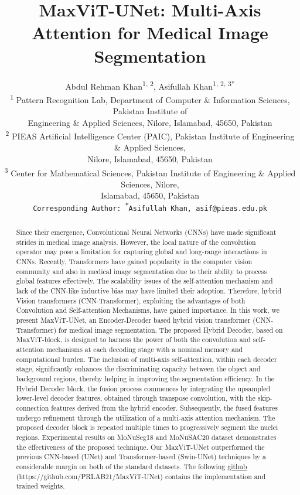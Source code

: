 \documentclass{article}
\title{MaxViT-UNet: Multi-Axis Attention for Medical Image Segmentation
}
\author{
  Abdul Rehman Khan\textsuperscript{1, 2}, Asifullah Khan\textsuperscript{1, 2, 3*} \\
  \textsuperscript{1} Pattern Recognition Lab, Department of Computer \& Information Sciences, Pakistan Institute of \\Engineering \& Applied Sciences, Nilore, Islamabad, 45650, Pakistan \\
  \textsuperscript{2} PIEAS Artificial Intelligence Center (PAIC), Pakistan Institute of Engineering \& Applied Sciences, \\Nilore, Islamabad, 45650, Pakistan \\
  \textsuperscript{3} Center for Mathematical Sciences, Pakistan Institute of Engineering \& Applied Sciences, Nilore, \\Islamabad, 45650, Pakistan \\
  \texttt{Corresponding Author: \textsuperscript{*}Asifullah Khan, asif@pieas.edu.pk} \\
}
\begin{document}
\maketitle


\begin{abstract}
Since their emergence, Convolutional Neural Networks (CNNs) have made significant strides in medical image analysis. However, the local nature of the convolution operator may pose a limitation for capturing global and long-range interactions in CNNs. Recently, Transformers have gained popularity in the computer vision community and also in medical image segmentation due to their ability to process global features effectively. The scalability issues of the self-attention mechanism and lack of the CNN-like inductive bias may have limited their adoption. Therefore, hybrid Vision transformers (CNN-Transformer), exploiting the advantages of both Convolution and Self-attention Mechanisms, have gained importance. In this work, we present MaxViT-UNet, an Encoder-Decoder based hybrid vision transformer (CNN-Transformer) for medical image segmentation. The proposed Hybrid Decoder, based on MaxViT-block, is designed to harness the power of both the convolution and self-attention mechanisms at each decoding stage with a nominal memory and computational burden. The inclusion of multi-axis self-attention, within each decoder stage, significantly enhances the discriminating capacity between the object and background regions, thereby helping in improving the segmentation efficiency. In the Hybrid Decoder block, the fusion process commences by integrating the upsampled lower-level decoder features, obtained through transpose convolution, with the skip-connection features derived from the hybrid encoder. Subsequently, the fused features undergo refinement through the utilization of a multi-axis attention mechanism. The proposed decoder block is repeated multiple times to progressively segment the nuclei regions. Experimental results on MoNuSeg18 and MoNuSAC20 dataset demonstrates the effectiveness of the proposed technique. Our MaxViT-UNet outperformed the previous CNN-based (UNet) and Transformer-based (Swin-UNet) techniques by a considerable margin on both of the standard datasets. The following \href{https://github.com/PRLAB21/MaxViT-UNet}{github} (https://github.com/PRLAB21/MaxViT-UNet) contains the implementation and trained weights.
\end{abstract}


\end{document}
